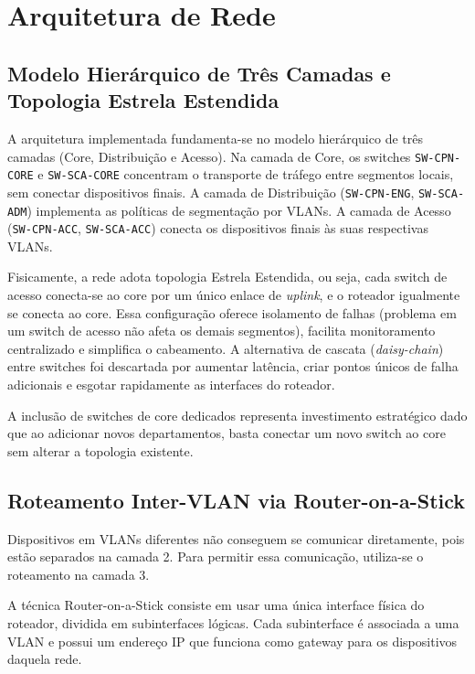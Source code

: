 \documentclass[12pt,a4paper]{article}
\begin{document}
\section{Arquitetura de Rede}

\subsection{Modelo Hierárquico de Três Camadas e Topologia Estrela Estendida}

A arquitetura implementada fundamenta-se no modelo hierárquico de três camadas
(Core, Distribuição e Acesso). Na camada de Core, os switches \texttt{SW-CPN-CORE}
e \texttt{SW-SCA-CORE} concentram o transporte de tráfego entre segmentos locais,
sem conectar dispositivos finais. A camada de Distribuição (\texttt{SW-CPN-ENG},
\texttt{SW-SCA-ADM}) implementa as políticas de segmentação por VLANs. A camada de
Acesso (\texttt{SW-CPN-ACC}, \texttt{SW-SCA-ACC}) conecta os dispositivos finais às
suas respectivas VLANs.

Fisicamente, a rede adota topologia Estrela Estendida, ou seja, cada switch de acesso
conecta-se ao core por um único enlace de \textit{uplink}, e o roteador igualmente
se conecta ao core. Essa configuração oferece isolamento de falhas (problema em um
switch de acesso não afeta os demais segmentos), facilita monitoramento centralizado
e simplifica o cabeamento. A alternativa de cascata (\textit{daisy-chain}) entre
switches foi descartada por aumentar latência, criar pontos únicos de falha
adicionais e esgotar rapidamente as interfaces do roteador.

A inclusão de switches de core dedicados representa investimento estratégico dado que ao
adicionar novos departamentos, basta conectar um novo switch ao core sem alterar a
topologia existente. 


\subsection{Roteamento Inter-VLAN via Router-on-a-Stick}

Dispositivos em VLANs diferentes não conseguem se comunicar diretamente, pois estão separados na camada 2. Para permitir essa comunicação, utiliza-se o roteamento na camada 3.

A técnica Router-on-a-Stick consiste em usar uma única interface física do roteador, dividida em subinterfaces lógicas. Cada subinterface é associada a uma VLAN e possui um endereço IP que funciona como gateway para os dispositivos daquela rede.
\end{document}
